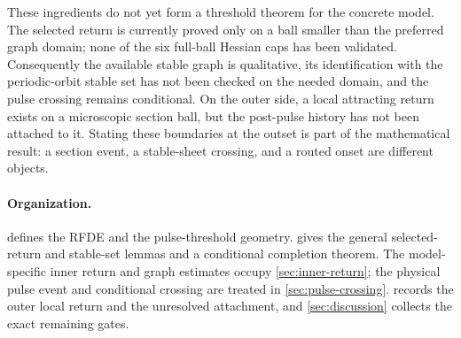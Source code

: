 These ingredients do not yet form a threshold theorem for the concrete model.
The selected return is currently proved only on a ball smaller than the
preferred graph domain; none of the six full-ball Hessian caps has been
validated.  Consequently the available stable graph is qualitative, its
identification with the periodic-orbit stable set has not been checked on the
needed domain, and the pulse crossing remains conditional.  On the outer
side, a local attracting return exists on a microscopic section ball, but the
post-pulse history has not been attached to it.  Stating these boundaries at
the outset is part of the mathematical result: a section event, a stable-sheet
crossing, and a routed onset are different objects.

\paragraph{Organization.}
 defines the RFDE and the pulse-threshold geometry.
 gives the general selected-return and stable-set
lemmas and a conditional completion theorem.  The model-specific inner
return and graph estimates occupy \cref{sec:inner-return}; the physical pulse
event and conditional crossing are treated in \cref{sec:pulse-crossing}.
 records the outer local return and the unresolved
attachment, and \cref{sec:discussion} collects the exact remaining gates.

